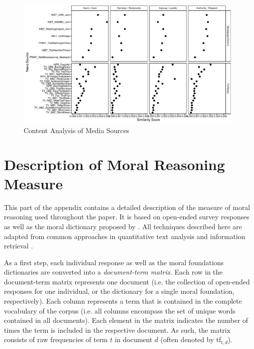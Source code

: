 \documentclass[12pt]{article}
\begin{document}

\begin{figure}[ht]\centering
\includegraphics[width=\textwidth]{../calc/fig/media_desc.pdf}
\caption{Content Analysis of Media Sources
}\label{fig:media_desc}
\end{figure}


\clearpage
\section{Description of Moral Reasoning Measure}\label{app:measure}

This part of the appendix contains a detailed description of the measure of moral reasoning used throughout the paper. It is based on open-ended survey responses as well as the moral dictionary proposed by \citet{graham2009liberals}. All techniques described here are adapted from common approaches in quantitative text analysis and information retrieval \citep[see for exampe][for an introduction and from which much of the notation in this part of the appendix is adapted]{manning2008introduction}.

As a first step, each individual response as well as the moral foundations dictionaries are converted into a \textit{document-term matrix}. Each row in the document-term matrix represents one document (i.e. the collection of open-ended responses for one individual, or the dictionary for a single moral foundation, respectively). Each column represents a term that is contained in the complete vocabulary of the corpus (i.e. all columns encompass the set of unique words contained in all documents). Each element in the matrix indicates the number of times the term is included in the respective document. As such, the matrix consists of raw frequencies of term $t$ in document $d$ (often denoted by tf$_{t,d}$).
\end{document}
